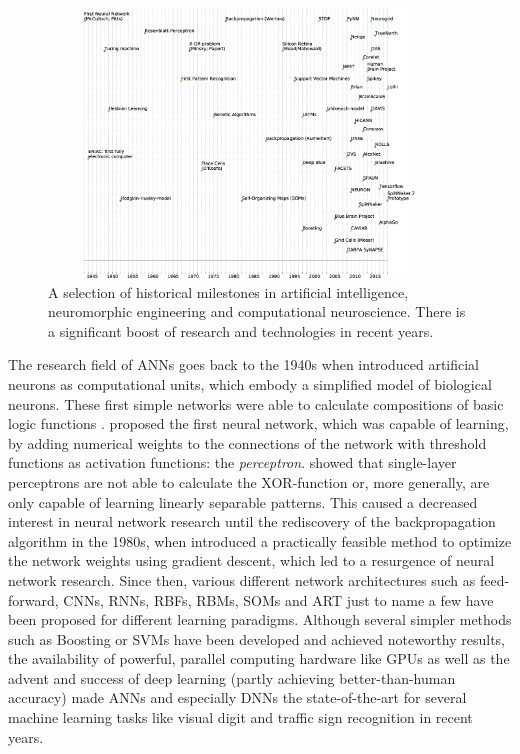 \begin{figure}[t!]
	\centering
	\includegraphics[width=0.95\textwidth,height=270px]{imgs/neuromorphic_timeline.eps}
	\caption{A selection of historical milestones in artificial intelligence, neuromorphic engineering and computational neuroscience. There is a significant boost of research and technologies in recent years.}
	\label{fig:neuro_time}
\end{figure}
The research field of \acfp{ANN} goes back to the 1940s when \textcite{McCulloch1943} introduced artificial neurons as computational units, which embody a simplified model of biological neurons.
These first simple networks were able to calculate compositions of basic logic functions \parencite{McCulloch1943, Rojas1996}.
\textcite{Rosenblatt58} proposed the first neural network, which was capable of learning, by adding numerical weights to the connections of the network with threshold functions as activation functions: the \textit{perceptron}.
\textcite{Minsky1969} showed that single-layer perceptrons are not able to calculate the XOR-function or, more generally, are only capable of learning linearly separable patterns.
This caused a decreased interest in neural network research until the rediscovery of the backpropagation algorithm \parencite{Werbos1974} in the 1980s, when \textcite{Rumelhart1986} introduced a practically feasible method to optimize the network weights using gradient descent, which led to a resurgence of neural network research.
Since then, various different network architectures such as feed-forward, \acp{CNN}, \acp{RNN}, \acp{RBF}, \acp{RBM}, \acp{SOM} and \ac{ART} just to name a few \parencite{Schmidhuber2015} have been proposed for different learning paradigms.
Although several simpler methods such as Boosting \parencite{Freund1997} or \acp{SVM} \parencite{Vapnik1995} have been developed and achieved noteworthy results, the availability of powerful, parallel computing hardware like \acp{GPU} as well as the advent and success  of deep learning (partly achieving better-than-human accuracy) made \acp{ANN} \parencite{Rojas1996} and especially \acp{DNN} \parencite{LeCun2015} the state-of-the-art for several machine learning tasks like visual digit \parencite{Ciresan2012a} and traffic sign \parencite{Ciresan2012} recognition in recent years.
